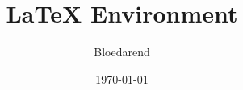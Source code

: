 \documentclass{article}
\title{LaTeX Environment}
\author{Bloedarend}
\date{\today}
\begin{document}
    \maketitle

    \begin{center}

    \end{center}
\end{document}
